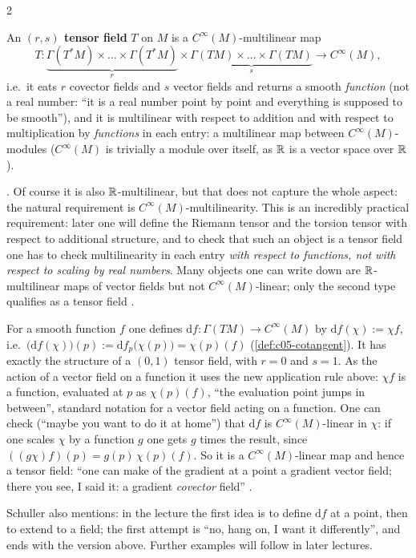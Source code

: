 \begin{paracol}{2}
\begin{definition}\label{def:c06-tensorfield}
An \textbf{$(r,s)$ tensor field} $T$ on $M$ is a $C^\infty(M)$-multilinear map
\[
  T\colon\underbrace{\Gamma(T^*M)\times\dots\times\Gamma(T^*M)}_{r}\times\underbrace{\Gamma(TM)\times\dots\times\Gamma(TM)}_{s}\longrightarrow C^\infty(M),
\]
i.e.\ it eats $r$ covector fields and $s$ vector fields and returns a smooth \emph{function} (not a real number: ``it is a real number point by point and everything is supposed to be smooth''), and it is multilinear with respect to addition and with respect to multiplication by \emph{functions} in each entry: a multilinear map between $C^\infty(M)$-modules ($C^\infty(M)$ is trivially a module over itself, as $\mathbb{R}$ is a vector space over $\mathbb{R}$).
\end{definition}
.
Of course it is also $\mathbb{R}$-multilinear, but that does not capture the whole aspect: the natural requirement is $C^\infty(M)$-multilinearity. This is an incredibly practical requirement: later one will define the Riemann tensor and the torsion tensor with respect to additional structure, and to check that such an object is a tensor field one has to check multilinearity in each entry \emph{with respect to functions, not with respect to scaling by real numbers}.
Many objects one can write down are $\mathbb{R}$-multilinear maps of vector fields but not $C^\infty(M)$-linear; only the second type qualifies as a tensor field .

\begin{example}\label{ex:c06-df}
For a smooth function $f$ one defines $\mathrm df\colon\Gamma(TM)\to C^\infty(M)$ by $\mathrm df(\chi):=\chi f$, i.e.\ $\bigl(\mathrm df(\chi)\bigr)(p):=\mathrm df_p\bigl(\chi(p)\bigr)=\chi(p)(f)$ (\cref{def:c05-cotangent}). It has exactly the structure of a $(0,1)$ tensor field, with $r=0$ and $s=1$. As the action of a vector field on a function it uses the new application rule above: $\chi f$ is a function, evaluated at $p$ as $\chi(p)(f)$, ``the evaluation point jumps in between'', standard notation for a vector field acting on a function.
One can check (``maybe you want to do it at home'') that $\mathrm df$ is $C^\infty(M)$-linear in $\chi$: if one scales $\chi$ by a function $g$ one gets $g$ times the result, since $((g\chi)f)(p)=g(p)\,\chi(p)(f)$. So it is a $C^\infty(M)$-linear map and hence a tensor field: ``one can make of the gradient at a point a gradient vector field; there you see, I said it: a gradient \emph{covector} field''
.
\end{example}
Schuller also mentions: in the lecture the first idea is to define $\mathrm df$ at a point, then to extend to a field; the first attempt is ``no, hang on, I want it differently'', and ends with the version above. Further examples will follow in later lectures.


\end{paracol}
